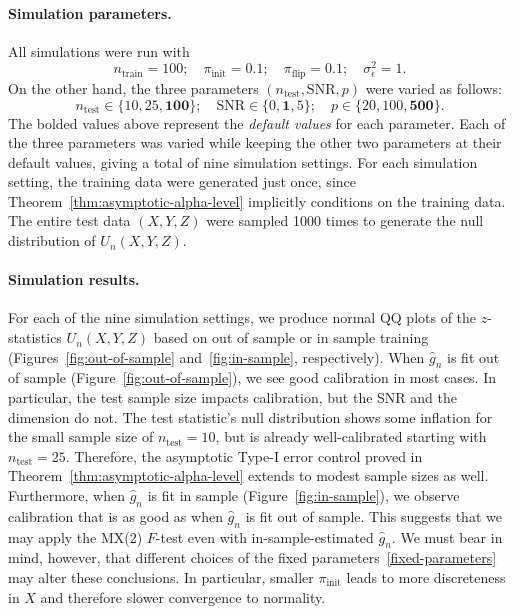 \documentclass[12pt]{article}
\theoremstyle{definition}
\theoremstyle{remark}
\newcommand{\eps}{\epsilon}
\newcommand{\srx}{X}
\newcommand{\srz}{Z}
\newcommand{\sry}{Y}
\begin{document}
\paragraph{Simulation parameters.}

All simulations were run with 
\begin{equation}
	n_{\text{train}} = 100; \quad \pi_{\text{init}} = 0.1; \quad \pi_{\text{flip}} = 0.1; \quad \sigma^2_\eps = 1. 
	\label{fixed-parameters}
\end{equation}
On the other hand, the three parameters $(n_{\text{test}}, \text{SNR}, p)$ were varied as follows:
\begin{equation*}
	n_{\text{test}} \in \{10, 25, \textbf{100}\}; \quad  \text{SNR} \in \{0, \textbf{1}, 5\}; \quad p \in \{20, 100, \textbf{500}\}.
\end{equation*}
The bolded values above represent the \textit{default values} for each parameter. Each of the three parameters was varied while keeping the other two parameters at their default values, giving a total of nine simulation settings. For each simulation setting, the training data were generated just once, since Theorem~\ref{thm:asymptotic-alpha-level} implicitly conditions on the training data. The entire test data $(\srx, \sry, \srz)$  were sampled 1000 times to generate the null distribution of $U_n(\srx, \sry, \srz)$. 

\paragraph{Simulation results.}

For each of the nine simulation settings, we produce normal QQ plots of the  $z$-statistics $U_n(\srx, \sry, \srz)$ based on out of sample or in sample training (Figures~\ref{fig:out-of-sample} and~\ref{fig:in-sample}, respectively). When $\widehat g_n$ is fit out of sample (Figure~\ref{fig:out-of-sample}), we see good calibration in most cases. In particular, the test sample size impacts calibration, but the SNR and the dimension do not. The test statistic's null distribution shows some inflation for the small sample size of $n_{\text{test}} = 10$, but is already well-calibrated starting with $n_{\text{test}} = 25$. Therefore, the asymptotic Type-I error control proved in Theorem~\ref{thm:asymptotic-alpha-level} extends to modest sample sizes as well. Furthermore, when $\widehat g_n$ is fit in sample (Figure~\ref{fig:in-sample}), we observe calibration that is as good as when $\widehat g_n$ is fit out of sample. This suggests that we may apply the MX(2) $F$-test even with in-sample-estimated $\widehat g_n$. We must bear in mind, however, that different choices of the fixed parameters~\eqref{fixed-parameters} may alter these conclusions. In particular, smaller $\pi_{\text{init}}$ leads to more discreteness in $\srx$ and therefore slower convergence to normality.
\end{document}
